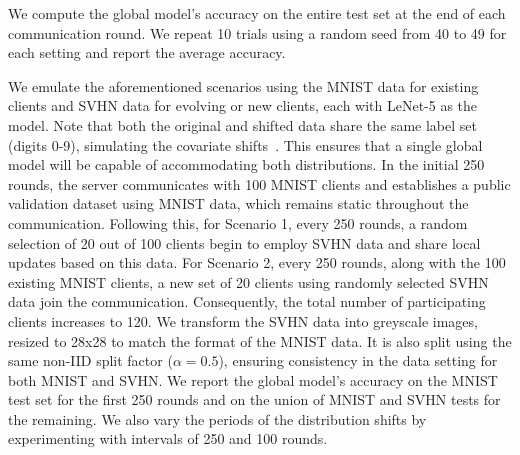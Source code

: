 We compute the global model's accuracy on the entire test set at the end of each communication round. We repeat 10 trials using a random seed from 40 to 49 for each setting and report the average accuracy.


 We emulate the aforementioned scenarios using the MNIST data for existing clients and SVHN data for evolving or new clients, each with LeNet-5 as the model.
Note that both the original and shifted data share the same label set (\ie digits 0-9), simulating the covariate shifts~\cite{ood_bench, bai2023feed}. This ensures that a single global model will be capable of accommodating both distributions.
In the initial 250 rounds, the server communicates with 100 MNIST clients and establishes a public validation dataset using MNIST data, which remains static throughout the communication.
Following this, for Scenario 1, every 250 rounds, a random selection of 20 out of 100 clients begin to employ SVHN data and share local updates based on this data.
For Scenario 2, every 250 rounds, along with the 100 existing MNIST clients, a new set of 20 clients using randomly selected SVHN data join the communication. Consequently, the total number of participating clients increases to 120.
We transform the SVHN data into greyscale images, resized to 28x28 to match the format of the MNIST data. It is also split using the same non-IID split factor ($\alpha = 0.5$), ensuring consistency in the data setting for both MNIST and SVHN.
We report the global model's accuracy on the MNIST test set for the first 250 rounds and on the union of MNIST and SVHN tests for the remaining.
We also vary the periods of the distribution shifts by experimenting with intervals of 250 and 100 rounds.


